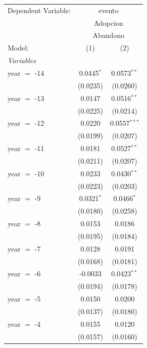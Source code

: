 
\begingroup
\centering
\begin{tabular}{lcc}
   \tabularnewline \midrule \midrule
   Dependent Variable: & \multicolumn{2}{c}{evento}\\
    & \multicolumn{2}{c}{Adopcion} \\ 
    & \multicolumn{2}{c}{Abandono} \\ 
   Model:          & (1)             & (2)\\  
   \midrule
   \emph{Variables}\\
   year $=$ -14    & 0.0445$^{*}$    & 0.0573$^{**}$\\   
                   & (0.0235)        & (0.0260)\\   
   year $=$ -13    & 0.0147          & 0.0516$^{**}$\\   
                   & (0.0225)        & (0.0214)\\   
   year $=$ -12    & 0.0220          & 0.0557$^{***}$\\   
                   & (0.0199)        & (0.0207)\\   
   year $=$ -11    & 0.0181          & 0.0527$^{**}$\\   
                   & (0.0211)        & (0.0207)\\   
   year $=$ -10    & 0.0233          & 0.0430$^{**}$\\   
                   & (0.0223)        & (0.0203)\\   
   year $=$ -9     & 0.0321$^{*}$    & 0.0466$^{*}$\\   
                   & (0.0180)        & (0.0258)\\   
   year $=$ -8     & 0.0153          & 0.0186\\   
                   & (0.0195)        & (0.0184)\\   
   year $=$ -7     & 0.0128          & 0.0191\\   
                   & (0.0168)        & (0.0181)\\   
   year $=$ -6     & -0.0033         & 0.0423$^{**}$\\   
                   & (0.0194)        & (0.0178)\\   
   year $=$ -5     & 0.0150          & 0.0200\\   
                   & (0.0137)        & (0.0180)\\   
   year $=$ -4     & 0.0155          & 0.0120\\   
                   & (0.0157)        & (0.0160)\\   

\end{tabular}
